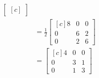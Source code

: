 \documentclass[a4paper,12pt,fleqn]{article}
\begin{document}
\begin{answer}
\begin{align*}
\begin{bmatrix}[c]
    \end{bmatrix}
    \\
    & = \frac{1}{2} \begin{bmatrix}[c]
      8 & 0 & 0 \\
      0 & 6 & 2 \\
      0 & 2 & 6
    \end{bmatrix}
    \\
    & = \begin{bmatrix}[c]
      4 & 0 & 0 \\
      0 & 3 & 1 \\
      0 & 1 & 3
    \end{bmatrix}
  \end{align*}
\end{answer}


\end{document}
